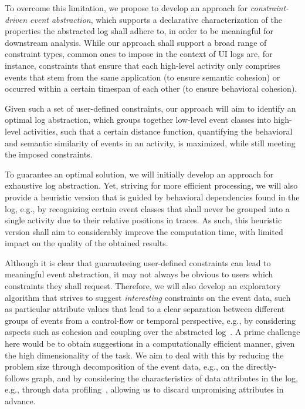 To overcome this limitation, we propose to develop an approach for \emph{constraint-driven event abstraction}, which supports a declarative characterization of the properties the abstracted log shall adhere to, in order to be meaningful for downstream analysis. While our approach shall support a broad range of constraint types, common ones to impose in the context of UI logs are, for instance, constraints that ensure that each high-level activity only comprises events that stem from the same application (to ensure semantic cohesion) or occurred within a certain timespan of each other (to ensure behavioral cohesion). 

Given such a set of user-defined constraints, our approach will aim to identify an optimal log abstraction, which groups together low-level event classes into high-level activities, such that a certain distance function, quantifying the behavioral and semantic similarity of events in an activity, is maximized, while still meeting the imposed constraints.

To guarantee an optimal solution, we will initially develop an approach for exhaustive log abstraction. Yet, striving for more efficient processing, we will also provide a heuristic version that is guided by behavioral dependencies found in the log, e.g., by recognizing certain event classes that shall never be grouped into a single activity due to their relative positions in traces.
As such, this heuristic version shall aim to considerably improve the computation time, with limited impact on the quality of the obtained results.

Although it is clear that guaranteeing user-defined constraints can lead to meaningful event abstraction, it may not always be obvious to users which constraints they shall request. Therefore, we will also develop an exploratory algorithm that strives to suggest \emph{interesting} constraints on the event data, such as particular attribute values that lead to a clear separation between different groups of events from a control-flow or temporal perspective, e.g., by considering aspects such as cohesion and coupling over the  abstracted log~\cite{vanderfeesten2007quality}. 
A prime challenge here would be to obtain suggestions in a computationally efficient manner, given the high dimensionality of the task. We aim to deal with this by reducing the problem size through decomposition of the event data, e.g., on the directly-follows graph, and by considering the characteristics of data attributes in the log, e.g., through data profiling~\cite{papenbrock2015data}, allowing us to discard unpromising attributes in advance.


